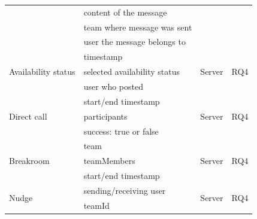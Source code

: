 \begin{table}[h]
\begin{tabularx}{.9\textwidth}{l X l l}
                                             & content of the message                 &                         &                               \\
                                             & team where message was sent            &                         &                               \\
                                             & user the message belongs to            &                         &                               \\
        \midrule
        \multirow{3}{*}{Availability status} & timestamp                              & \multirow{3}{*}{Server} & \multirow{3}{*}{RQ4}          \\
                                             & selected availability status           &                         &                               \\
                                             & user who posted                        &                         &                               \\
        \midrule
        \multirow{3}{*}{Direct call}         & start/end timestamp                    & \multirow{3}{*}{Server} & \multirow{3}{*}{RQ4}          \\
                                             & participants                           &                         &                               \\
                                             & success: true or false                 &                         &                               \\
        \midrule
        \multirow{3}{*}{Breakroom}           & team                                   & \multirow{3}{*}{Server} & \multirow{3}{*}{RQ4}          \\
                                             & teamMembers                            &                         &                               \\
                                             & start/end timestamp                    &                         &                               \\
        \midrule
        \multirow{4}{*}{Nudge}               & sending/receiving user                 & \multirow{4}{*}{Server} & \multirow{4}{*}{RQ4}          \\
                                             & teamId                                 &                         &                               \\

\end{tabularx}
\end{table}
